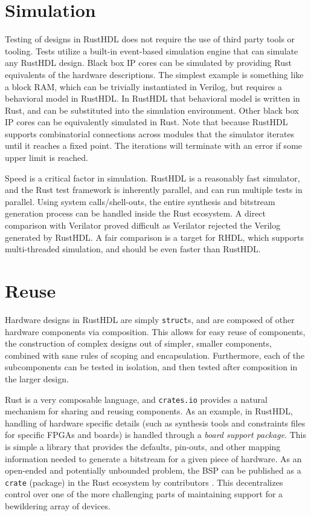 \documentclass[sigplan,screen,sigconf]{acmart}
\begin{document}
\section{Simulation}
Testing of designs in RustHDL does not require the use of third party tools or tooling.  
Tests utilize a built-in event-based simulation engine that can simulate any RustHDL design.
Black box IP cores can be simulated by providing Rust equivalents of the hardware descriptions.
The simplest example is something like a block RAM, which can be trivially instantiated in 
Verilog, but requires a behavioral model in RustHDL.  In RustHDL that behavioral model is 
written in Rust, and can be substituted into the simulation environment.  Other black box
IP cores can be equivalently simulated in Rust.  Note that because RustHDL supports combinatorial
connections across modules that the simulator iterates until it reaches a fixed point.  The 
iterations will terminate with an error if some upper limit is reached.

Speed is a critical factor in simulation.  RustHDL is a reasonably fast simulator, 
and the Rust test framework is inherently parallel, and can run multiple tests in parallel. 
Using system calls/shell-outs, the entire synthesis and bitstream generation process 
can be handled inside the Rust ecosystem.  A direct comparison with Verilator proved difficult
as Verilator rejected the Verilog generated by RustHDL.  A fair comparison is a target for RHDL,
which supports multi-threaded simulation, and should be even faster than RustHDL.

\section{Reuse}
Hardware designs in RustHDL are simply \verb|struct|s, and are composed of other 
hardware components via composition.  This allows for easy reuse of components, the
construction of complex designs out of simpler, smaller components, combined with sane rules of
scoping and encapsulation.  Furthermore, each of the subcomponents can be tested in 
isolation, and then tested after composition in the larger design. 

Rust is a very composable language, and \verb|crates.io| provides a natural mechanism
for sharing and reusing components.  As an example, in RustHDL, handling of hardware specific
details (such as synthesis tools and constraints files for specific FPGAs and boards) is 
handled through a \emph{board support package}.  This is simple a library that provides the
defaults, pin-outs, and other mapping information needed to generate a bitstream for a given piece of
hardware.  As an open-ended and potentially unbounded problem, the BSP can be published as
a \verb|crate| (package) in the Rust ecosystem by contributors \cite{b7}.  This decentralizes control
over one of the more challenging parts of maintaining support for a bewildering array of 
devices. 
\end{document}
